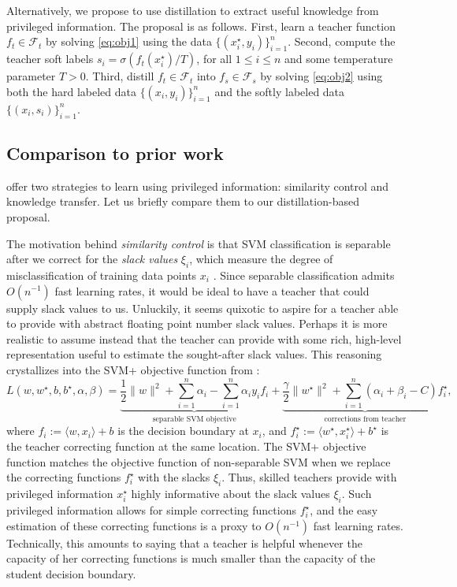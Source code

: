 \documentclass{article}
\begin{document}
Alternatively, we propose to use distillation to extract useful knowledge from
privileged information.  The proposal is as follows. First, learn a teacher
function $f_t \in \mathcal{F}_t$ by solving \eqref{eq:obj1} using the data
$\{(x^\star_i, y_i)\}_{i=1}^n$.  Second, compute the teacher soft labels $s_i =
\sigma(f_t(x^\star_i)/T)$, for all $1\leq i\leq n$ and some temperature
parameter $T > 0$.  Third, distill $f_t \in \mathcal{F}_t$ into $f_s \in
\mathcal{F}_s$ by solving \eqref{eq:obj2} using both the hard labeled data
$\{(x_i, y_i)\}_{i=1}^n$ and the softly labeled data $\{(x_i,s_i)\}_{i=1}^n$.

\subsection{Comparison to prior work}

\citet{Vapnik09,VapIzm15} offer two strategies to learn using privileged information:
similarity control and knowledge transfer. Let us briefly compare them to 
our distillation-based proposal.

The motivation behind \emph{similarity control} is that SVM
classification is separable after we correct for the \emph{slack values}
$\xi_i$, which measure the degree of misclassification of training data points $x_i$
\citep{Vapnik09}.
Since separable classification admits
$O(n^{-1})$ fast learning rates, it would be ideal to have a teacher that could
supply slack values to us.  Unluckily, it seems quixotic to aspire for a teacher able
to provide with abstract floating point number slack values. Perhaps it is more
realistic to assume instead that the teacher can provide with some rich,
high-level representation useful to estimate the sought-after slack values.  This
reasoning crystallizes into the SVM+ objective function from \citep{Vapnik09}:
\begin{equation}\label{eq:similarity-control}
  L(w,w^\star,b,b^\star, \alpha, \beta) =
  \underbrace{\frac{1}{2}\|w\|^2 + \sum_{i=1}^n \alpha_i - \sum_{i=1}^n
  \alpha_i y_i f_i}_{\textrm{separable SVM objective}}
  + \underbrace{\frac{\gamma}{2} \|w^\star\|^2 + \sum_{i=1}^n (\alpha_i + \beta_i
  - C) {f^\star_i}}_{\textrm{corrections from teacher}},
\end{equation}
where $f_i := \langle w, x_i \rangle +b$ is the decision boundary at $x_i$, and
$f^\star_i := \langle w^\star, x^\star_i \rangle +b^\star$ is the teacher
correcting function at the same location. The SVM+ objective function matches
the objective function of non-separable SVM when we replace the correcting
functions $f^\star_i$ with the slacks $\xi_i$. Thus, skilled teachers provide
with privileged information $x^\star_i$ highly informative about the slack values
$\xi_i$. Such privileged information allows for simple correcting functions
$f^\star_i$, and the easy estimation of these correcting functions is a proxy
to $O(n^{-1})$ fast learning rates. Technically, this amounts to
saying that a teacher is helpful whenever the capacity of her correcting
functions is much smaller than the capacity of the student decision
boundary.
\end{document}
